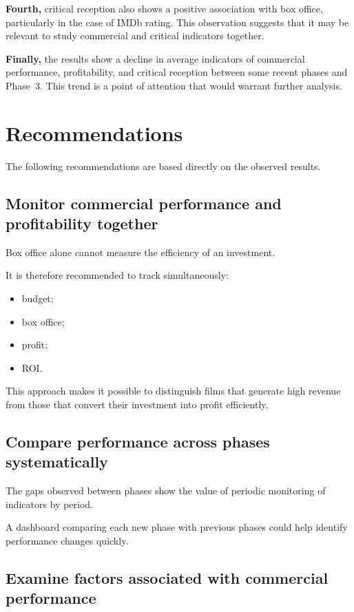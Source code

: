 \documentclass[a4paper,11pt]{article}
\begin{document}
\textbf{Fourth,} critical reception also shows a positive association
with box office, particularly in the case of IMDb rating. This
observation suggests that it may be relevant to study commercial and
critical indicators together.

\textbf{Finally,} the results show a decline in average indicators of
commercial performance, profitability, and critical reception between
some recent phases and Phase~3. This trend is a point of attention that
would warrant further analysis.

\section{Recommendations}

The following recommendations are based directly on the observed
results.

\subsection{Monitor commercial performance and profitability together}

Box office alone cannot measure the efficiency of an investment.

It is therefore recommended to track simultaneously:
\begin{itemize}
  \item budget;
  \item box office;
  \item profit;
  \item ROI.
\end{itemize}

This approach makes it possible to distinguish films that generate high
revenue from those that convert their investment into profit
efficiently.

\subsection{Compare performance across phases systematically}

The gaps observed between phases show the value of periodic monitoring
of indicators by period.

A dashboard comparing each new phase with previous phases could help
identify performance changes quickly.

\subsection{Examine factors associated with commercial performance}
\end{document}
